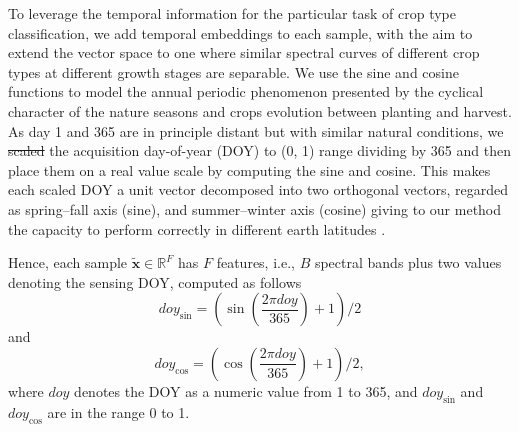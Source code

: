 \documentclass[journal,article,submit,pdftex,moreauthors]{Definitions/mdpi}
\providecommand{\DIFadd}[1]{{\protect\color{blue}\uwave{#1}}} %
\providecommand{\DIFdel}[1]{{\protect\color{red}\sout{#1}}}                      %
\providecommand{\DIFaddbegin}{} %
\providecommand{\DIFaddend}{} %
\providecommand{\DIFdelbegin}{} %
\providecommand{\DIFdelend}{} %
\begin{document}
To leverage the temporal information for the particular task of crop type classification, we add temporal embeddings to each sample, with the aim to extend the vector space to one where similar spectral curves of different crop types at different growth stages are separable. 
We use the sine and cosine functions to model the annual periodic phenomenon presented by the cyclical character of the nature seasons and crops evolution between planting and harvest. As day 1 and 365 are in principle distant but with similar natural conditions, we \DIFdelbegin \DIFdel{scaled }\DIFdelend \DIFaddbegin \DIFadd{embed time by scaling }\DIFaddend the acquisition day-of-year (\ac{DOY}) to (0, 1) range dividing by 365 and then place them on a real value scale by computing the sine and cosine. This makes each scaled \ac{DOY} a unit vector decomposed into two orthogonal vectors, regarded as spring–fall axis (sine), and summer–winter axis (cosine) giving to our method the capacity to perform correctly in different earth latitudes \cite{Dahlin2016}.

Hence, each sample $\mathbf{\tilde{x}} \in \mathbb{R}^F$
has $F$ features, i.e., $B$ spectral bands plus two values denoting the sensing \ac{DOY}, computed as follows
\begin{equation}
	doy_{\sin} = \left(\sin\left(\frac{2\pi doy}{365}\right)+1\right)/2
\end{equation}
and
\begin{equation}
	doy_{\cos} = \left(\cos\left(\frac{2\pi doy}{365}\right)+1\right)/2, 
\end{equation}
where $doy$ denotes the \ac{DOY} as a numeric value from 1 to 365, and $doy_{\sin}$ and $doy_{\cos}$ are in the range 0 to 1.
\end{document}
